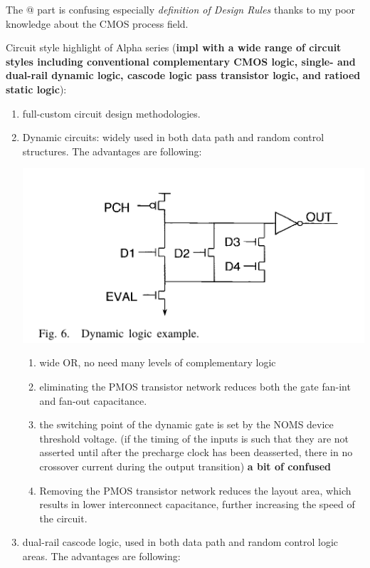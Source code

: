 \documentclass[11pt]{article}
\makeatletter
\newcommand{\Rmnum}[1]{\expandafter\@slowromancap\romannumeral #1@}
\newcommand{\note}[1]{\scriptsize{#1}\normalsize}
\makeatother
\begin{document}
The \Rmnum{3} part is confusing especially \textit{definition of Design Rules} thanks to my poor knowledge about the CMOS process field.
\newline

Circuit style highlight of Alpha series (\textbf{impl with a wide range of circuit styles including conventional complementary CMOS logic, single- and dual-rail dynamic logic, cascode logic pass transistor logic, and ratioed static logic}):
\begin{enumerate}
	\item full-custom circuit design methodologies. 
	\item Dynamic circuits: widely used in both data path and random control structures. The advantages are following:\\
	\begin{center}
		\includegraphics[scale=0.5]{dynamic.png}
	\end{center}
	\begin{enumerate}
		\item wide OR, no need many levels of complementary logic
		\item eliminating the PMOS transistor network reduces both the gate fan-int and fan-out capacitance. 
		\item the switching point of the dynamic gate is set by the NOMS device threshold voltage. (\note{if the timing of the inputs is such that they are not asserted until after the precharge clock has been deasserted, there in no crossover current during the output transition}) \textbf{a bit of confused}
		\item Removing the PMOS transistor network reduces the layout area, which results in lower interconnect capacitance, further increasing the speed of the circuit.
	\end{enumerate}
	\item dual-rail cascode logic, used in both data path and random control logic areas. The advantages are following:\\

\end{enumerate}
\end{document}
